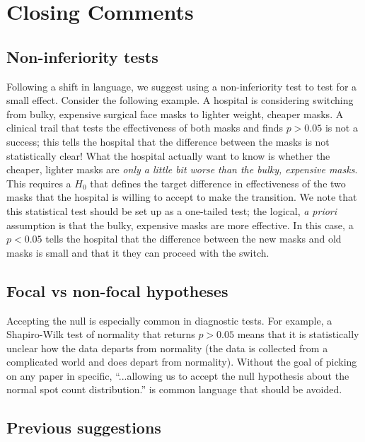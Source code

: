 
\section*{Closing Comments}

\subsection*{Non-inferiority tests}

Following a shift in language, we suggest using a non-inferiority test to test for a small effect. Consider the following 
example. A hospital is considering switching from bulky, expensive surgical face masks to lighter weight, cheaper masks. A
clinical trail that tests the effectiveness of both masks and finds $p > 0.05$ is not a success; this tells the hospital 
that the difference between the masks is not statistically clear! What the hospital actually want to know is whether the 
cheaper, lighter masks are \emph{only a little bit worse than the bulky, expensive masks}. This requires a $H_{0}$ that 
defines the target difference in effectiveness of the two masks that the hospital is willing to accept to make the 
transition. We note that this statistical test should be set up as a one-tailed test; the logical, \emph{a priori} 
assumption is that the bulky, expensive masks are more effective. In this case, a $p < 0.05$ tells the hospital that the 
difference between the new masks and old masks is small and that it they can proceed with the switch.

\subsection*{Focal vs non-focal hypotheses}

Accepting the null is especially common in diagnostic tests. For example, a Shapiro-Wilk test of normality that
returns $p > 0.05$ means that it is statistically unclear how the data departs from normality (the data is collected
from a complicated world and does depart from normality). Without the goal of picking on any paper in specific, 
``...allowing us to accept the null hypothesis about the normal spot count distribution.'' \citep{Karulinetal.2015} 
is common language that should be avoided.

\subsection*{Previous suggestions}

